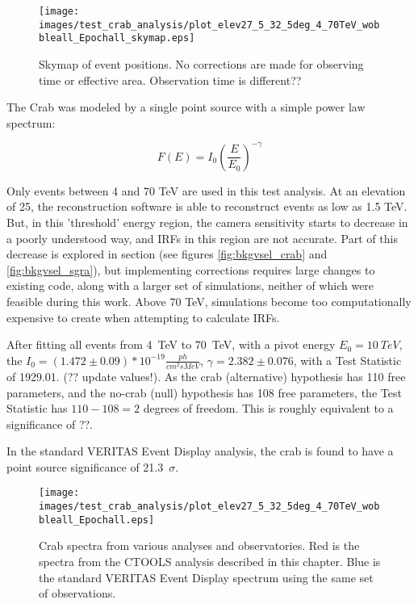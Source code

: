     \begin{figure}[h]
      \centering
      \texttt{[image: images/test\_crab\_analysis/plot\_elev27\_5\_32\_5deg\_4\_70TeV\_wobbleall\_Epochall\_skymap.eps]}
      \caption[Crab Counts Skymap]
      {
        Skymap of event positions.
        No corrections are made for observing time or effective area.
        Observation time is different??
      }
      \label{fig:crab_skymap}
    \end{figure}
    
    The Crab was modeled by a single point source with a simple power law spectrum:

    \begin{equation} \label{eqn:powerlaw}
    F\left( E \right) = I_{0} \left( \frac{E}{E_{0}} \right)^{-\gamma}
    \end{equation}

    Only events between 4 and 70 TeV are used in this test analysis.
    At an elevation of 25\degree, the reconstruction software is able to reconstruct events as low as 1.5 TeV.
    But, in this 'threshold' energy region, the camera sensitivity starts to decrease in a poorly understood way, and IRFs in this region are not accurate.
    Part of this decrease is explored in section (see figures \ref{fig:bkgvsel_crab} and \ref{fig:bkgvsel_sgra}), but implementing corrections requires large changes to existing code, along with a larger set of simulations, neither of which were feasible during this work.
    Above 70 TeV, simulations become too computationally expensive to create when attempting to calculate IRFs.
    
    After fitting all events from \SI{4}{TeV} to \SI{70}{TeV}, with a pivot energy $ E_{0}= \SI{10}{TeV} $, the $ I_{0} = \left(1.472\pm0.09\right)*10^{-19} \frac{ph}{cm^{2} s MeV} $, $ \gamma = 2.382 \pm 0.076 $, with a Test Statistic of 1929.01. (?? update values!).
    As the crab (alternative) hypothesis has 110 free parameters, and the no-crab (null) hypothesis has 108 free parameters, the Test Statistic has $ 110 - 108 = 2 $ degrees of freedom.
    This is roughly equivalent to a significance of ??.
    
    In the standard VERITAS Event Display analysis, the crab is found to have a point source significance of \SI{21.3}{$\sigma$}.
    
    
    \begin{figure}[h]
      \centering
      \texttt{[image: images/test\_crab\_analysis/plot\_elev27\_5\_32\_5deg\_4\_70TeV\_wobbleall\_Epochall.eps]}
      \caption[Crab Test Spectrum]
      {
        Crab spectra from various analyses and observatories.
        Red is the spectra from the CTOOLS analysis described in this chapter.
        Blue is the standard VERITAS Event Display spectrum using the same set of observations.
      }
      \label{fig:crab_test_spectra}
    \end{figure}
    
